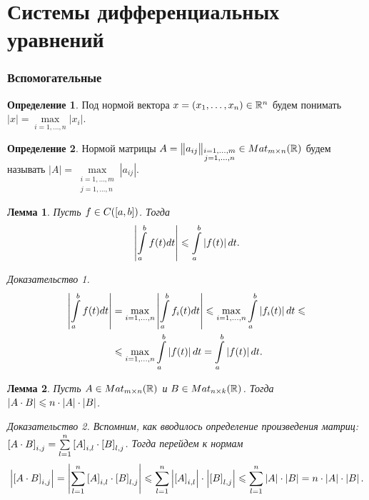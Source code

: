 \documentclass[a5paper, 10pt]{article}
\theoremstyle{definition}
\newtheorem{Def}{Определение}
\theoremstyle{plain}
\newtheorem{Lem}{Лемма}
\theoremstyle{remark}
\newtheorem*{Proof}{Доказательство}
\begin{document}
	
	\part{Системы дифференциальных уравнений}
	\section{}	
	
	\section{Вспомогательные }
	\begin{Def}
		Под нормой вектора $x=\left(x_1, \dots, x_n\right) \in \mathbb{R}^n$ будем понимать $|x| = \max\limits_{i=1,\dots,n}|x_i|$.
	\end{Def}
	\begin{Def}
		Нормой матрицы $A = \begin{Vmatrix}
			a_{ij}
		\end{Vmatrix}_{\substack{i=1,\dots,m\\j=1,\dots,n}} \in Mat_{m\times n}(\mathbb{R})$ будем называть $|A| = \max\limits_{\substack{i=1,\dots,m\\j=1,\dots,n}} |a_{ij}|$.
	\end{Def}
	\begin{Lem}
		Пусть $f \in C(\left[a,b\right])$. Тогда 
		\[
		\left|\int\limits_a^b f(t) dt\right| \leqslant \int\limits_a^b \left|f(t)\right| dt.
		\]
		\begin{Proof}
			\[
			\begin{split}
				\left|\int\limits_a^b f(t) dt\right| &= \max\limits_{i=1,\dots,n}\left|\int\limits_a^b f_i(t) dt\right| \leqslant \max\limits_{i=1,\dots,n}\int\limits_a^b \left|f_i(t)\right| dt \leqslant \\
				&\leqslant \max\limits_{i=1,\dots,n}\int\limits_a^b \left|f(t)\right| dt = \int\limits_a^b \left|f(t)\right| dt.
			\end{split}
			\]
		\end{Proof}
	\end{Lem}
	\begin{Lem}
		Пусть $A \in Mat_{m\times n}(\mathbb{R})$ и $B \in Mat_{n\times k}(\mathbb{R})$. Тогда $\left|A\cdot B\right| \leqslant n \cdot \left|A\right| \cdot \left|B\right|$.
		\begin{Proof}
			Вспомним, как вводилось определение произведения матриц: $\left[A\cdot B\right]_{i,j} = \sum\limits_{l=1}^n \left[A\right]_{i,l} \cdot \left[B\right]_{l,j}$. Тогда перейдем к нормам
			\[
			\begin{split}
				\left|\left[A\cdot B\right]_{i,j}\right| = \left|\sum\limits_{l=1}^n \left[A\right]_{i,l} \cdot \left[B\right]_{l,j}\right| \leqslant \sum\limits_{l=1}^n \left|\left[A\right]_{i,l}\right| \cdot \left|\left[B\right]_{l,j}\right| \leqslant \sum\limits_{l=1}^n \left|A\right| \cdot \left|B\right| = n \cdot \left|A\right|\cdot\left|B\right|.
			\end{split}
			\]
		\end{Proof}
	\end{Lem}
\end{document}
